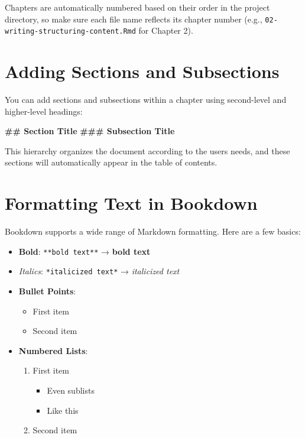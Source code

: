 \documentclass[
]{book}
\newenvironment{Shaded}{\begin{snugshade}}{\end{snugshade}}
\newcommand{\FunctionTok}[1]{\textcolor[rgb]{0.13,0.29,0.53}{\textbf{#1}}}
\providecommand{\tightlist}{%
  \setlength{\itemsep}{0pt}\setlength{\parskip}{0pt}}
\theoremstyle{definition}
\theoremstyle{definition}
\theoremstyle{definition}
\theoremstyle{definition}
\theoremstyle{remark}
\begin{document}
Chapters are automatically numbered based on their order in the project directory, so make sure each file name reflects its chapter number (e.g., \texttt{02-writing-structuring-content.Rmd} for Chapter 2).

\section{Adding Sections and Subsections}\label{adding-sections-and-subsections}

You can add sections and subsections within a chapter using second-level and higher-level headings:

\begin{Shaded}
\begin{Highlighting}[]
\FunctionTok{\#\# Section Title}
\FunctionTok{\#\#\# Subsection Title}
\end{Highlighting}
\end{Shaded}

This hierarchy organizes the document according to the users needs, and these sections will automatically appear in the table of contents.

\section{Formatting Text in Bookdown}\label{formatting-text-in-bookdown}

Bookdown supports a wide range of Markdown formatting. Here are a few basics:

\begin{itemize}
\tightlist
\item
  \textbf{Bold}: \texttt{**bold\ text**} → \textbf{bold text}
\item
  \emph{Italics}: \texttt{*italicized\ text*} → \emph{italicized text}
\item
  \textbf{Bullet Points}:

  \begin{itemize}
  \tightlist
  \item
    First item
  \item
    Second item
  \end{itemize}
\item
  \textbf{Numbered Lists}:

  \begin{enumerate}
  \def\labelenumi{\arabic{enumi}.}
  \tightlist
  \item
    First item

    \begin{itemize}
    \tightlist
    \item
      Even sublists
    \item
      Like this
    \end{itemize}
  \item
    Second item
  \end{enumerate}
\end{itemize}
\end{document}
